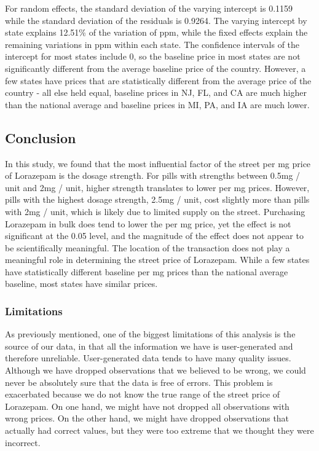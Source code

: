 \documentclass[
]{article}
\begin{document}
For random effects, the standard deviation of the varying intercept is
0.1159 while the standard deviation of the residuals is 0.9264. The
varying intercept by state explains 12.51\% of the variation of ppm,
while the fixed effects explain the remaining variations in ppm within
each state. The confidence intervals of the intercept for most states
include 0, so the baseline price in most states are not significantly
different from the average baseline price of the country. However, a few
states have prices that are statistically different from the average
price of the country - all else held equal, baseline prices in NJ, FL,
and CA are much higher than the national average and baseline prices in
MI, PA, and IA are much lower.

\hypertarget{conclusion}{%
\subsection{Conclusion}\label{conclusion}}

In this study, we found that the most influential factor of the street
per mg price of Lorazepam is the dosage strength. For pills with
strengths between 0.5mg / unit and 2mg / unit, higher strength
translates to lower per mg prices. However, pills with the highest
dosage strength, 2.5mg / unit, cost slightly more than pills with 2mg /
unit, which is likely due to limited supply on the street. Purchasing
Lorazepam in bulk does tend to lower the per mg price, yet the effect is
not significant at the 0.05 level, and the magnitude of the effect does
not appear to be scientifically meaningful. The location of the
transaction does not play a meaningful role in determining the street
price of Lorazepam. While a few states have statistically different
baseline per mg prices than the national average baseline, most states
have similar prices.

\hypertarget{limitations}{%
\subsubsection{Limitations}\label{limitations}}

As previously mentioned, one of the biggest limitations of this analysis
is the source of our data, in that all the information we have is
user-generated and therefore unreliable. User-generated data tends to
have many quality issues. Although we have dropped observations that we
believed to be wrong, we could never be absolutely sure that the data is
free of errors. This problem is exacerbated because we do not know the
true range of the street price of Lorazepam. On one hand, we might have
not dropped all observations with wrong prices. On the other hand, we
might have dropped observations that actually had correct values, but
they were too extreme that we thought they were incorrect.
\end{document}
